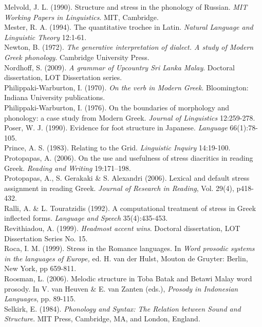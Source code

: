 \documentclass[a4paper]{article}
\begin{document}
Melvold, J. L. (1990). Structure and stress in the phonology of Russian. \textit{MIT Working Papers in Linguistics}. MIT, Cambridge.\\\noindent
Mester, R. A. (1994). The quantitative trochee in Latin. \textit{Natural Language and Linguistic Theory }12:1-61.\\\noindent
Newton, B. (1972). \textit{The generative interpretation of dialect. A study of Modern Greek phonology}. Cambridge University Press.\\\noindent
Nordhoff, S. (2009). \textit{A grammar of Upcountry Sri Lanka Malay}. Doctoral dissertation, LOT Dissertation series.\\\noindent
Philippaki-Warburton, I. (1970). \textit{On the verb in Modern Greek}. Bloomington: Indiana University publications.\\\noindent
Philippaki-Warburton, I. (1976). On the boundaries of morphology and phonology: a case study from Modern Greek. \textit{Journal of Linguistics} 12:259-278.\\\noindent
Poser, W. J. (1990). Evidence for foot structure in Japanese. \textit{Language} 66(1):78-105.\\\noindent
Prince, A. S. (1983). Relating to the Grid. \textit{Linguistic Inquiry }14:19-100.\\\noindent
Protopapas, A. (2006). On the use and usefulness of stress diacritics in reading Greek. \textit{Reading and Writing }19:171–198.\\\noindent
Protopapas, A., S. Gerakaki \& S. Alexandri (2006). Lexical and default stress assignment in reading Greek. \textit{Journal of Research in Reading}, Vol. 29(4), p418-432.\\\noindent
Ralli, A. \& L. Touratzidis (1992). A computational treatment of stress in Greek inflected forms. \textit{Language and Speech }35(4):435-453.\\\noindent
Revithiadou, A. (1999). \textit{Headmost accent wins}. Doctoral dissertation, LOT Dissertation Series No. 15.\\\noindent
Roca, I. M. (1999). Stress in the Romance languages. In \textit{Word prosodic systems in the languages of Europe, }ed. H. van der Hulst, Mouton de Gruyter: Berlin, New York, pp 659-811.\\\noindent
Roosman, L. (2006). Melodic structure in Toba Batak and Betawi Malay word prosody. In V. van Heuven \& E. van Zanten (eds.), \textit{Prosody in Indonesian Languages}, pp. 89-115.\\\noindent
Selkirk, E. (1984). \textit{Phonology and Syntax: The Relation between Sound and Structure}. MIT Press, Cambridge, MA, and London, England.\\\noindent
\end{document}
